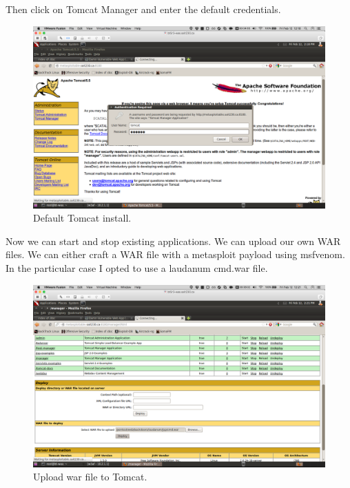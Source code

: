 \documentclass{article}
\begin{document}
\newpage
Then click on Tomcat Manager and enter the default credentials.

\begin{figure}[h!]
	\includegraphics[width=\linewidth]{images/tomcat-metasploitable-credentials.png}
	\caption{Default Tomcat install.}
	\label{fig:tomcat-injection2}
\end{figure}

\newpage
Now we can start and stop existing applications. We can upload our own WAR files.
We can either craft a WAR file with a metasploit payload using msfvenom. In the 
particular case I opted to use a laudanum cmd.war file.


\begin{figure}[h!]
	\includegraphics[width=\linewidth]{images/tomcat-metasploitable-upload.png}
	\caption{Upload war file to Tomcat.}
	\label{fig:tomcat-injection4}
\end{figure}
\end{document}
